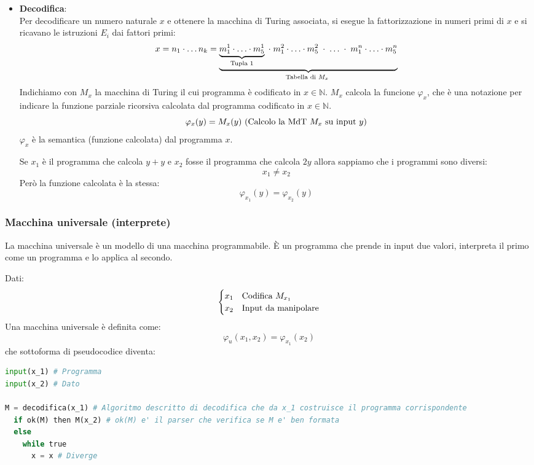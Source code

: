 \documentclass[a4paper]{article}
\begin{document}
\begin{itemize}
  \item \textbf{Decodifica}:\\
    Per decodificare un numero naturale \( x \) e ottenere la macchina di Turing
    associata, si esegue la fattorizzazione in numeri primi di \( x \) e si ricavano le
    istruzioni \( E_i \) dai fattori primi:
    \[
      x = n_1 \cdot \ldots n_k
      = \underbrace{\underbrace{m_1^1 \cdot \ldots \cdot m_5^1}_{\text{Tupla 1}} \;\cdot\; m_1^2 \cdot \ldots \cdot m_5^2 
      \;\cdot\; \ldots \;\cdot\; m_1^n \cdot \ldots \cdot m_5^n}_{\text{Tabella di \( M_x \) }}
    \] 
    Indichiamo con \( M_x \) la macchina di Turing il cui programma è codificato in
    \( x \in \mathbb{N} \). \( M_x \) calcola la funcione \( \varphi_x \), che è una
    notazione per indicare la funzione parziale ricorsiva calcolata dal programma
    codificato in \( x \in \mathbb{N} \).
    \[
      \varphi_x(y) = M_x(y) \text{ (Calcolo la MdT \( M_x \) su input \( y \))}
    \] 
    \( \varphi_x \) è la semantica (funzione calcolata) dal programma \( x \).
    \begin{example}
      Se \( x_1 \) è il programma che calcola \( y+y \) e \( x_2 \) fosse il programma
      che calcola \( 2y \) allora sappiamo che i programmi sono diversi:
      \[
        x_1 \neq x_2
      \] 
      Però la funzione calcolata è la stessa:
      \[
        \varphi_{x_1}(y) = \varphi_{x_2}(y)
      \] 
    \end{example}
\end{itemize}

\subsubsection{Macchina universale (interprete)}
La macchina universale è un modello di una macchina programmabile. È un programma che
prende in input due valori, interpreta il primo come un programma e lo applica al secondo.
\begin{definition}
  Dati:
  \[
    \begin{cases}
      x_1 & \text{Codifica \( M_{x_1} \)} \\
      x_2 & \text{Input da manipolare}
    \end{cases}
  \] 
  Una macchina universale è definita come:
  \[
    \varphi_u(x_1, x_2) = \varphi_{x_1}(x_2)
  \] 
  che sottoforma di pseudocodice diventa:
\begin{lstlisting}[language=Python]
input(x_1) # Programma
input(x_2) # Dato 

M = decodifica(x_1) # Algoritmo descritto di decodifica che da x_1 costruisce il programma corrispondente
  if ok(M) then M(x_2) # ok(M) e' il parser che verifica se M e' ben formata
  else 
    while true 
      x = x # Diverge
\end{lstlisting}
\end{definition}
\end{document}
